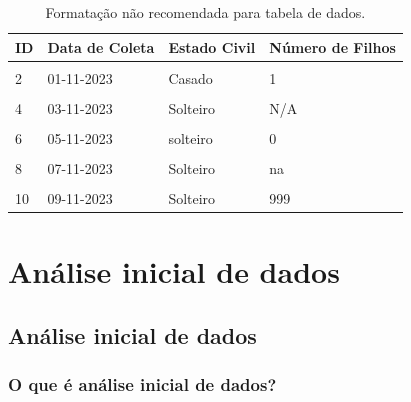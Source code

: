 \documentclass[
  a4paper,
]{book}
\begin{document}
\begin{table}

\caption{\label{tab:tabela-evite}Formatação não recomendada para tabela de dados.}
\centering
\begin{tabu} to 
\toprule
\textbf{ID} & \textbf{Data de Coleta} & \textbf{Estado Civil} & \textbf{Número de Filhos}\\
\midrule
{} &  &  & \\
2 & 01-11-2023 & Casado & 1\\
 &  &  & \\
4 & 03-11-2023 & Solteiro & N/A\\
 &  &  & \\
6 & 05-11-2023 & solteiro & 0\\
 &  &  & \\
8 & 07-11-2023 & Solteiro & na\\
 &  &  & \\
10 & 09-11-2023 & Solteiro & 999\\
\bottomrule
\end{tabu}
\end{table}

\hypertarget{analise-inicial-dados}{%
\chapter{\texorpdfstring{\textbf{Análise inicial de dados}}{Análise inicial de dados}}\label{analise-inicial-dados}}

\hypertarget{analise-inicial}{%
\section{Análise inicial de dados}\label{analise-inicial}}

\hypertarget{o-que-uxe9-anuxe1lise-inicial-de-dados}{%
\subsection{O que é análise inicial de dados?}\label{o-que-uxe9-anuxe1lise-inicial-de-dados}}
\end{document}
